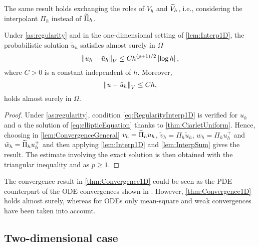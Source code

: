 \documentclass[10pt]{article}
\begin{document}
\begin{remark} The same result holds exchanging the roles of $V_h$ and $\widetilde V_h$, i.e., considering the interpolant $\Pi_h$ instead of $\widetilde \Pi_h$.
\end{remark}

\begin{theorem}\label{thm:Convergence1D} Under \cref{as:regularity} and in the one-dimensional setting of \cref{lem:Interp1D}, the probabilistic solution $\tilde u_h$ satisfies almost surely in $\Omega$
	\begin{equation}
		\left\|u_h - \tilde u_h\right\|_{V} \leq Ch^{(p+1)/2} \left\lvert\log h\right\rvert,
	\end{equation}
	where $C > 0$ is a constant independent of $h$. Moreover, 
	\begin{equation}
		\left\|u - \tilde u_h\right\|_V \leq Ch,
	\end{equation}
	holds almost surely in $\Omega$.
\end{theorem}
\begin{proof} Under \cref{as:regularity}, condition \eqref{eq:RegularityInterp1D} is verified for $u_h$ and $u$ the solution of \eqref{eq:ellipticEquation} thanks to \cref{thm:CiarletUniform}. Hence, choosing in \cref{lem:ConvergenceGeneral} $v_h = \widetilde \Pi_h u_h$, $\tilde v_h = \Pi_h \tilde u_h$, $w_h = \Pi_h u_h^+$ and $\tilde w_h = \widetilde \Pi_h u_h^+$ and then applying \cref{lem:Interp1D} and \cref{lem:InterpSum} gives the result. The estimate involving the exact solution is then obtained with the triangular inequality and as $p \geq 1$. 
\end{proof}

\begin{remark} The convergence result in \cref{thm:Convergence1D} could be seen as the PDE counterpart of the ODE convergences shown in \cite{AbG18, CGS16}. However, \cref{thm:Convergence1D} holds almost surely, whereas for ODEs only mean-square and weak convergences have been taken into account.
\end{remark}

\subsection{Two-dimensional case}
\end{document}
